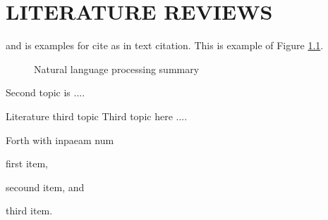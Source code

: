 \chapter{LITERATURE REVIEWS }


\citet*{BirdKleinLoper09}  and  \citet*{Perkins2010}  is examples for cite as in text citation.
This is example of Figure \ref{fig:nlpstep}.

\begin{figure}[!htb]
\centering
{}
\caption{Natural language processing summary}
\label{fig:nlpstep}
\end{figure}


Second topic  is ....

\begin{kkusubsubsection}{Literature third topic}
Third topic here ....

\end{kkusubsubsection} %


Forth with inpaeam num

\begin{inparaenum}[1\upshape)]
\item first item,
\item secound item,
and
\item third item.
\end{inparaenum}
